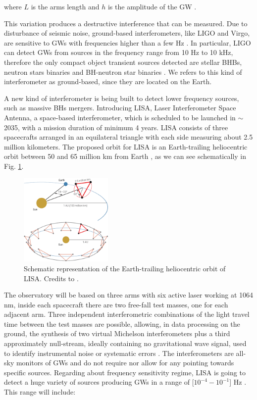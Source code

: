 \noindent
where $ L $ is the arms length and $ h $ is the amplitude of the GW \cite{Accadia_2012}.

This variation produces a destructive interference that can be measured. Due to disturbance of seismic noise, ground-based interferometers, like LIGO and Virgo, are sensitive to GWs with frequencies higher than a few Hz \cite{Accadia_2012}. 
In particular, LIGO can detect GWs from sources in the frequency range from 10 Hz to 10 kHz, therefore the only compact object transient sources detected are stellar BHBs, neutron stars binaries and BH-neutron star binaries \cite{Martynov_2016}.
We refers to this kind of interferometer as ground-based, since they are located on the Earth.


A new kind of interferometer is being built to detect lower frequency sources, such as massive BHs mergers. Introducing LISA, Laser Interferometer Space Antenna, a space-based interferometer, which is scheduled to be launched in $\sim$ 2035, with a  mission duration of minimum 4 years.  LISA consists of three spacecrafts arranged in an equilateral triangle with each side measuring about 2.5 million kilometers. The proposed orbit for LISA is an Earth-trailing heliocentric orbit between 50 and 65 million km from Earth \cite{amaroseoane2017laserinterferometerspaceantenna}, as we can see schematically in Fig. \ref{fig:LISA_orbit}. 


\begin{figure}[h!]
    \centering
    \includegraphics[width=0.4\textwidth]{LISA_orbit.png}
    \caption{Schematic representation of the Earth-trailing heliocentric orbit of LISA. Credits to \cite{amaroseoane2017laserinterferometerspaceantenna}. }
    \label{fig:LISA_orbit}
\end{figure}

The observatory will be based on three arms with six active laser working at  1064 nm, inside each spacecraft there are two free-fall test masses, one for each adjacent arm. Three independent interferometric combinations of the light travel time between the test masses are possible, allowing, in data processing on the ground, the synthesis of two virtual Michelson interferometers plus a third approximately null-stream, ideally containing no gravitational wave signal, used to identify instrumental noise or systematic errors \cite{amaroseoane2017laserinterferometerspaceantenna}.
The interferometers are all-sky monitors of GWs and do not require nor allow for any pointing towards specific sources. Regarding about frequency sensitivity regime, LISA is going to detect a huge variety of sources producing GWs in a range of [$10^{-4}-10^{-1}$] Hz \cite{amaroseoane2017laser}. This range will include:

